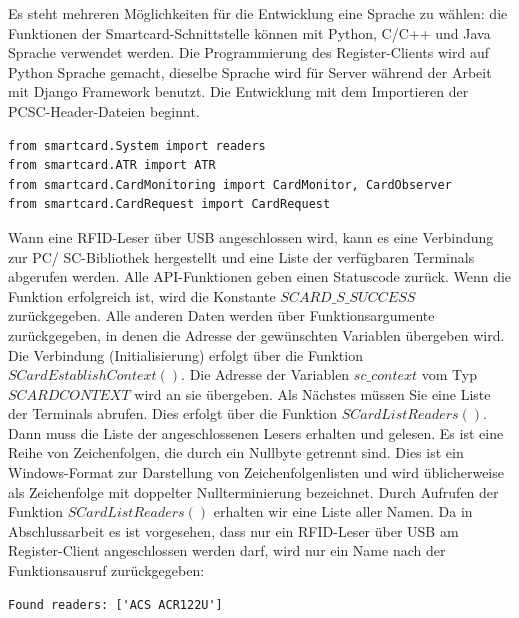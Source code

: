 Es steht mehreren Möglichkeiten für die Entwicklung eine Sprache zu wählen: die Funktionen der Smartcard-Schnittstelle können mit Python, C/C++ und Java Sprache verwendet werden. Die Programmierung des Register-Clients wird auf Python Sprache gemacht, dieselbe Sprache wird für Server während der Arbeit mit Django Framework benutzt. Die Entwicklung mit dem Importieren der PCSC-Header-Dateien beginnt. 
\begin{lstlisting}
from smartcard.System import readers
from smartcard.ATR import ATR
from smartcard.CardMonitoring import CardMonitor, CardObserver
from smartcard.CardRequest import CardRequest
\end{lstlisting}
Wann eine RFID-Leser über USB angeschlossen wird, kann es eine Verbindung zur PC/ SC-Bibliothek hergestellt und eine Liste der verfügbaren Terminals abgerufen werden. Alle API-Funktionen geben einen Statuscode zurück. Wenn die Funktion erfolgreich ist, wird die Konstante  $SCARD\_S\_SUCCESS$  zurückgegeben. Alle anderen Daten werden über Funktionsargumente zurückgegeben, in denen die Adresse der gewünschten Variablen übergeben wird. Die Verbindung (Initialisierung) erfolgt über die Funktion $SCardEstablishContext()$\cite[p. 101]{chirico:smart_card}. Die Adresse der Variablen $sc\_context$ vom Typ $SCARDCONTEXT$ wird an sie übergeben. Als Nächstes müssen Sie eine Liste der Terminals abrufen. Dies erfolgt über die Funktion $SCardListReaders()$. Dann muss die Liste der angeschlossenen Lesers erhalten und gelesen. Es ist eine Reihe von Zeichenfolgen, die durch ein Nullbyte getrennt sind. Dies ist ein Windows-Format zur Darstellung von Zeichenfolgenlisten und wird üblicherweise als Zeichenfolge mit doppelter Nullterminierung bezeichnet. Durch Aufrufen der Funktion $SCardListReaders()$ erhalten wir eine Liste aller Namen\cite[p. 102]{chirico:smart_card}. Da in Abschlussarbeit es ist vorgesehen, dass nur ein RFID-Leser über USB am Register-Client angeschlossen werden darf, wird nur ein Name nach der Funktionsausruf zurückgegeben:
\begin{lstlisting}
Found readers: ['ACS ACR122U']
\end{lstlisting}

